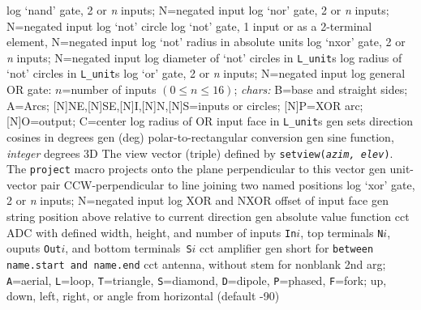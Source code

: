   {log}
  {`nand' gate, 2 or {\sl n\/} inputs; N=negated input}
  {log}
  {`nor' gate, 2 or {\sl n\/} inputs; N=negated input}
  {log}
  {`not' circle}
  {log}
  {`not' gate, 1 input or as a 2-terminal element, N=negated input}
  {log}
  {`not' radius in absolute units}
  {log}
  {`nxor' gate, 2 or {\sl n\/} inputs; N=negated input}
  {log}
  {diameter of `not' circles in {\tt L\_unit}s}
  {log}
  {radius of `not' circles in {\tt L\_unit}s}
  {log}
  {`or' gate, 2 or {\sl n\/} inputs; N=negated input}
  {log}
  {general OR gate: $n$=number of inputs $(0\leq n\leq 16)$;
    {\sl chars:} B=base and straight sides; A=Arcs;
           [N]NE,[N]SE,[N]I,[N]N,[N]S=inputs or circles;
           [N]P=XOR arc; [N]O=output; C=center }
  {log}
  {radius of OR input face in {\tt L\_unit}s}
  {gen}
  {sets direction cosines in degrees}
  {gen}
  {(deg) polar-to-rectangular conversion}
  {gen}
  {sine function, {\sl integer\/} degrees}
  {3D}
  {The view vector (triple) defined by {\tt setview({\sl azim, elev})}. The 
   {\tt project}
   macro projects onto the plane perpendicular to this vector}
  {gen}
  {unit-vector pair CCW-perpendicular to line joining two named positions}
  {log}
  {`xor' gate, 2 or {\sl n\/} inputs; N=negated input}
  {log}
  {XOR and NXOR offset of input face}
  {gen}
  {string position above relative to current direction}
  {gen}
  {absolute value function}
  {cct}
  {ADC with defined width, height, and number of inputs {\tt In$i$},
    top terminals {\tt N$i$}, ouputs {\tt Out$i$},
    and bottom terminals~{\tt S$i$}}
  {cct}
  {amplifier}
  {gen}
  {short for {\tt between name.start and name.end}}
  {cct}
  {antenna, without stem for nonblank 2nd arg; {\tt A}=aerial,
    {\tt L}=loop, {\tt T}=triangle, {\tt S}=diamond, {\tt D}=dipole,
    {\tt P}=phased, {\tt F}=fork;
    up, down, left, right, or angle from horizontal (default -90) }
